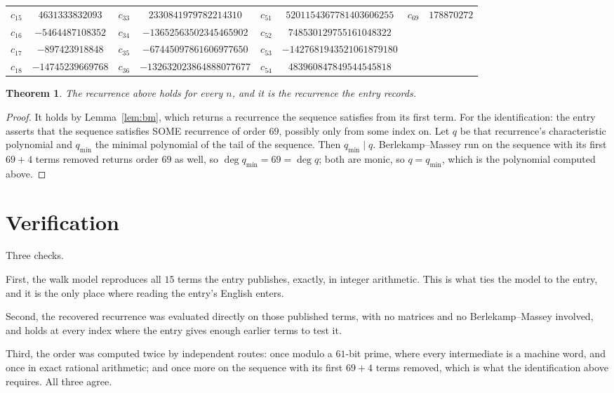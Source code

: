 \documentclass[11pt,a4paper]{article}
\theoremstyle{plain}
\newtheorem{theorem}{Theorem}
\theoremstyle{definition}
\begin{document}
\begin{center}
\begin{tabular}{cccccccc}
$c_{15}$ & $4631333832093$ & $c_{33}$ & $2330841979782214310$ & $c_{51}$ & $5201154367781403606255$ & $c_{69}$ & $178870272$ \\
$c_{16}$ & $-5464487108352$ & $c_{34}$ & $-13652563502345465902$ & $c_{52}$ & $748530129755161048322$ &  &  \\
$c_{17}$ & $-897423918848$ & $c_{35}$ & $-67445097861606977650$ & $c_{53}$ & $-1427681943521061879180$ &  &  \\
$c_{18}$ & $-14745239669768$ & $c_{36}$ & $-132632023864888077677$ & $c_{54}$ & $483960847849544545818$ &  &  \\
\end{tabular}
\end{center}

\begin{theorem}
The recurrence above holds for every $n$, and it is the recurrence the entry records.
\end{theorem}

\begin{proof}
It holds by Lemma~\ref{lem:bm}, which returns a recurrence the sequence satisfies from its
first term. For the identification: the entry asserts that the sequence satisfies SOME
recurrence of order $69$, possibly only from some index on. Let $q$ be that recurrence's
characteristic polynomial and $q_{\min}$ the minimal polynomial of the tail of the sequence.
Then $q_{\min}\mid q$. Berlekamp--Massey run on the sequence with its first $69+4$ terms
removed returns order $69$ as well, so $\deg q_{\min}=69=\deg q$; both are monic, so
$q=q_{\min}$, which is the polynomial computed above.
\end{proof}

\section{Verification}

Three checks.

First, the walk model reproduces all $15$ terms the entry publishes, exactly, in integer
arithmetic. This is what ties the model to the entry, and it is the only place where reading
the entry's English enters.

Second, the recovered recurrence was evaluated directly on those published terms, with no
matrices and no Berlekamp--Massey involved, and holds at every index where the entry gives
enough earlier terms to test it.

Third, the order was computed twice by independent routes: once modulo a $61$-bit prime, where
every intermediate is a machine word, and once in exact rational arithmetic; and once more on
the sequence with its first $69+4$ terms removed, which is what the identification above
requires. All three agree.
\end{document}
